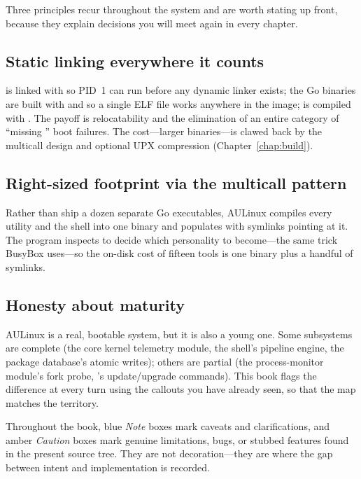 Three principles recur throughout the system and are worth stating up front,
because they explain decisions you will meet again in every chapter.

\subsection{Static linking everywhere it counts}
 is linked with  so PID~1 can run before any dynamic
linker exists; the Go binaries are built with  and
 so a single ELF file works anywhere in the image;
 is compiled with . The payoff is relocatability and
the elimination of an entire category of ``missing '' boot failures.
The cost---larger binaries---is clawed back by the multicall design and optional
UPX compression (Chapter~\ref{chap:build}).

\subsection{Right-sized footprint via the multicall pattern}
Rather than ship a dozen separate Go executables, AULinux compiles every utility
and the shell into one  binary and populates  with
symlinks pointing at it. The program inspects  to decide which
personality to become---the same trick BusyBox uses---so the on-disk cost of
fifteen tools is one binary plus a handful of symlinks.

\subsection{Honesty about maturity}
AULinux is a real, bootable system, but it is also a young one. Some subsystems
are complete (the core kernel telemetry module, the shell's pipeline engine, the
package database's atomic writes); others are partial (the process-monitor
module's fork probe, 's update/upgrade commands). This book flags the
difference at every turn using the callouts you have already seen, so that the
map matches the territory.

\begin{warnbox}
Throughout the book, blue \emph{Note} boxes mark caveats and clarifications, and
amber \emph{Caution} boxes mark genuine limitations, bugs, or stubbed features
found in the present source tree. They are not decoration---they are where the
gap between intent and implementation is recorded.
\end{warnbox}

